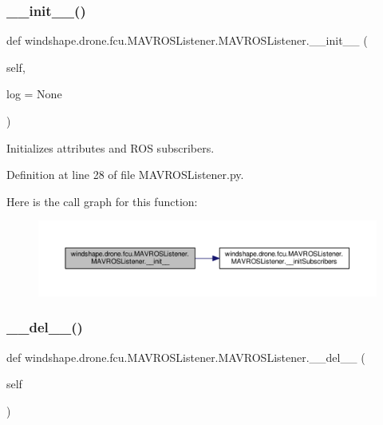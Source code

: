 \subsubsection{\texorpdfstring{\+\_\+\+\_\+init\+\_\+\+\_\+()}{\_\_init\_\_()}}
{\footnotesize\ttfamily def windshape.\+drone.\+fcu.\+M\+A\+V\+R\+O\+S\+Listener.\+M\+A\+V\+R\+O\+S\+Listener.\+\_\+\+\_\+init\+\_\+\+\_\+ (\begin{DoxyParamCaption}\item[{}]{self,  }\item[{}]{log = {\ttfamily None} }\end{DoxyParamCaption})}

\begin{DoxyVerb}Initializes attributes and ROS subscribers.\end{DoxyVerb}
 

Definition at line 28 of file M\+A\+V\+R\+O\+S\+Listener.\+py.

Here is the call graph for this function\+:\nopagebreak
\begin{figure}[H]
\begin{center}
\leavevmode
\includegraphics[width=350pt]{classwindshape_1_1drone_1_1fcu_1_1_m_a_v_r_o_s_listener_1_1_m_a_v_r_o_s_listener_adc66f66ce7c42fd27f42cb361447ee75_cgraph}
\end{center}
\end{figure}
\mbox{\label{classwindshape_1_1drone_1_1fcu_1_1_m_a_v_r_o_s_listener_1_1_m_a_v_r_o_s_listener_a130c4c7a29f2e9c4dc8d56bb7ad5e29b}} 
\subsubsection{\texorpdfstring{\+\_\+\+\_\+del\+\_\+\+\_\+()}{\_\_del\_\_()}}
{\footnotesize\ttfamily def windshape.\+drone.\+fcu.\+M\+A\+V\+R\+O\+S\+Listener.\+M\+A\+V\+R\+O\+S\+Listener.\+\_\+\+\_\+del\+\_\+\+\_\+ (\begin{DoxyParamCaption}\item[{}]{self }\end{DoxyParamCaption})}

